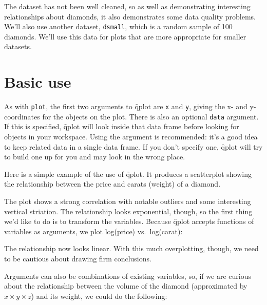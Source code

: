 The dataset has not been well cleaned, so as well as demonstrating interesting relationships about diamonds, it also demonstrates some data quality problems. We'll also use another dataset, {\tt dsmall}, which is a random sample of 100 diamonds. We'll use this data for plots that are more appropriate for smaller datasets. 

% 


\section{Basic use}
\label{sec:basic_use}

As with  {\tt plot}, the first two arguments to \f{qplot} are {\tt x} and {\tt y}, giving the x- and y-coordinates for the objects on the plot. There is also an optional {\tt data} argument.  If this is specified, \f{qplot} will look inside that data frame before looking for objects in your workspace.  Using the  argument is recommended: it's a good idea to keep related data in a single data frame.  If you don't specify one, \f{qplot} will try to build one up for you and may look in the wrong place.

Here is a simple example of the use of \f{qplot}.  It produces a scatterplot showing the relationship between the price and carats (weight) of a diamond. 

% 


The plot shows a strong correlation with notable outliers and some interesting vertical striation.  The relationship looks exponential, though, so the first thing we'd like to do is to transform the variables.  Because \f{qplot} accepts functions of variables as arguments, we plot log(price) vs.\ log(carat):

% 


\noindent The relationship now looks linear.  With this much overplotting, though, we need to be cautious about drawing firm conclusions.

Arguments can also be combinations of existing variables, so, if we are curious about the relationship between the volume of the diamond (approximated by $x \times y \times z$) and its weight, we could do the following:

